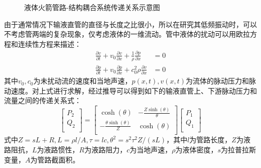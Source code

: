 \begin{figure}[!htb]
  \centering
  \caption{液体火箭管路-结构耦合系统传递关系示意图}\label{POGO-PipeLine}
\end{figure}

\begin{enumerate}[label=\textbf{\Roman*.}, align=left, leftmargin=0pt, listparindent=\parindent, itemindent=!, labelwidth=\parindent, labelsep=0pt, itemsep=1em]
  由于通常情况下输液直管的直径与长度之比很小，所以在研究其低频振动时，可以不考虑管两端的复杂现象，仅考虑液体的一维流动。管中液体的扰动可以用欧拉方程和连续性方程来描述：
  \begin{align}
    \frac{\partial v}{\partial t}+{{v}_{0}}\frac{\partial v}{\partial x}+\frac{1}{\rho }\frac{\partial p}{\partial x} & =0 \nonumber \\
    \frac{\partial p}{\partial t}+{{v}_{0}}\frac{\partial p}{\partial x}+c_{0}^{2}\rho \frac{\partial v}{\partial x}  & =0
  \end{align}
  其中$v_0,c_0$为未扰动流的速度和当地声速，$p(x,t),v(x,t)$为流体的脉动压力和脉动速度。对上式进行求解，经过推导可以得到如下的输液直管上、下游脉动压力和流量之间的传递关系式：
  \begin{equation}
    \label{eq:Straight-Tube}
    \left[ \begin{matrix}
        {{P}_{2}} \\
        {{Q}_{2}} \\
      \end{matrix} \right]=\left[ \begin{matrix}
        \cosh \left( \theta  \right)                                   & {\displaystyle -\frac{Z\sinh \left( \theta  \right)}{\theta }} \\
        {\displaystyle -\frac{\theta \sinh \left( \theta  \right)}{Z}} & \cosh \left( \theta  \right)                                   \\
      \end{matrix} \right]\left[ \begin{matrix}
        {{P}_{1}} \\
        {{Q}_{1}} \\
      \end{matrix} \right]
  \end{equation}
  式中$Z=sL+R,L=\rho l/A,\tau =lc,\theta^2=s^2\tau^2Z/(sL)$，其中$l$为管路长度，$Z$为液路阻抗，$L$为液路惯性，$R$为液路阻力，$c$为当地声速，$\rho$为液体密度，$s$为拉普拉斯变量，$A$为管路截面积。


\end{enumerate}

